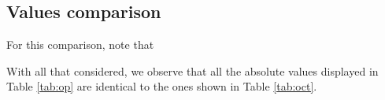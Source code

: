 
\subsection{Values comparison}

For this comparison, note that

With all that considered, we observe that all the absolute values displayed in Table
\ref{tab:op} are identical to the ones shown in Table \ref{tab:oct}.

